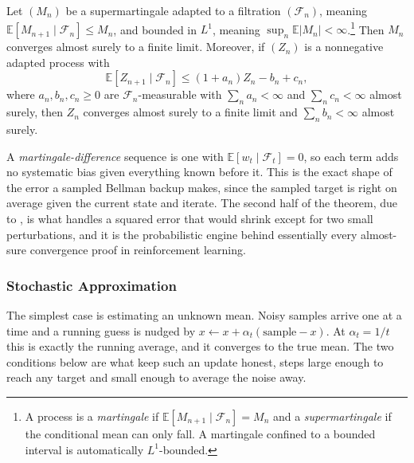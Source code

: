 \begin{theorem}
\label{thm:prelim_martingale}
Let $(M_n)$ be a supermartingale adapted to a filtration $(\mathcal{F}_n)$, meaning $\mathbb{E}[M_{n+1} \mid \mathcal{F}_n] \leq M_n$, and bounded in $L^1$, meaning $\sup_n \mathbb{E}|M_n| < \infty$.\footnote{A process is a \emph{martingale} if $\mathbb{E}[M_{n+1} \mid \mathcal{F}_n] = M_n$ and a \emph{supermartingale} if the conditional mean can only fall. A martingale confined to a bounded interval is automatically $L^1$-bounded.} Then $M_n$ converges almost surely to a finite limit. Moreover, if $(Z_n)$ is a nonnegative adapted process with
\begin{equation}
\mathbb{E}[Z_{n+1} \mid \mathcal{F}_n] \leq (1 + a_n) Z_n - b_n + c_n,
\label{eq:prelim_robbins_siegmund}
\end{equation}
where $a_n, b_n, c_n \geq 0$ are $\mathcal{F}_n$-measurable with $\sum_n a_n < \infty$ and $\sum_n c_n < \infty$ almost surely, then $Z_n$ converges almost surely to a finite limit and $\sum_n b_n < \infty$ almost surely.
\end{theorem}

A \emph{martingale-difference} sequence is one with $\mathbb{E}[w_t \mid \mathcal{F}_t] = 0$, so each term adds no systematic bias given everything known before it. This is the exact shape of the error a sampled Bellman backup makes, since the sampled target is right on average given the current state and iterate. The second half of the theorem, due to \citet{robbinssiegmund1971}, is what handles a squared error that would shrink except for two small perturbations, and it is the probabilistic engine behind essentially every almost-sure convergence proof in reinforcement learning.

\subsubsection{Stochastic Approximation}

The simplest case is estimating an unknown mean. Noisy samples arrive one at a time and a running guess is nudged by $x \leftarrow x + \alpha_t(\text{sample} - x)$. At $\alpha_t = 1/t$ this is exactly the running average, and it converges to the true mean. The two conditions below are what keep such an update honest, steps large enough to reach any target and small enough to average the noise away.

